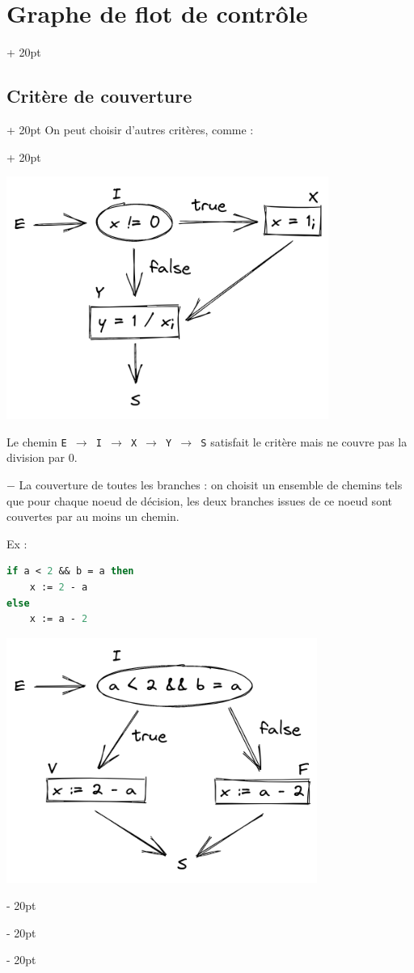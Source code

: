 \documentclass[a4paper, 12pt, twoside]{article}
\newcommand{\ind}[1][20pt]{\advance\leftskip + #1}
\newcommand{\deind}[1][20pt]{\advance\leftskip - #1}
\newenvironment{indentedenv}[1][20pt]{\par \ind[#1]}{\par \deind}
\newenvironment{indt}[2][20pt]{#2 \begin{indentedenv}[#1]}{\end{indentedenv}} %
\begin{document}
\begin{indt}{\section{Graphe de flot de contrôle}}
\begin{indt}{\subsection{Critère de couverture}}
\begin{indt}{On peut choisir d'autres critères, comme :}
                \begin{center}
                    \includegraphics[scale=.4]{draw/draw3.png}
                \end{center}
                
                Le chemin \texttt{E $\rightarrow$ I $\rightarrow$ X $\rightarrow$ Y $\rightarrow$ S} satisfait le critère mais ne couvre pas la division par 0.
                
                \vspace{12pt}
                
                $-$ La couverture de toutes les branches : on choisit un ensemble de chemins tels que pour chaque noeud de décision, les deux branches issues de ce noeud sont couvertes par au moins un chemin.
                
                Ex :
                \begin{lstlisting}[language=Caml, xleftmargin=80pt]
if a < 2 && b = a then
    x := 2 - a
else
    x := a - 2\end{lstlisting}
                
                \begin{center}
                    \includegraphics[scale=.4]{draw/draw4.png}
                \end{center}
                

\end{indt}
\end{indt}
\end{indt}
\end{document}
